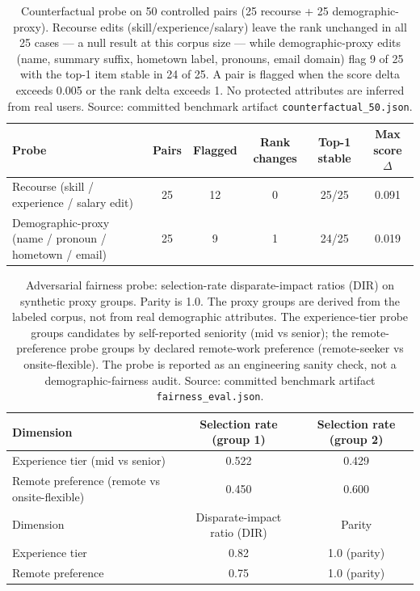 \begin{table}[!t]
\centering
\caption{Counterfactual probe on 50 controlled pairs (25 recourse + 25 demographic-proxy). Recourse edits (skill/experience/salary) leave the rank unchanged in all 25 cases --- a null result at this corpus size --- while demographic-proxy edits (name, summary suffix, hometown label, pronouns, email domain) flag 9 of 25 with the top-1 item stable in 24 of 25. A pair is flagged when the score delta exceeds 0.005 or the rank delta exceeds 1. No protected attributes are inferred from real users. Source: committed benchmark artifact \texttt{counterfactual\_50.json}.}
\label{tab:counterfactual}
\scriptsize
\setlength{\tabcolsep}{4pt}
\begin{tabular*}{\textwidth}{@{\extracolsep{\fill}}lccccc@{}}
\toprule
Probe & Pairs & Flagged & Rank changes & Top-1 stable & Max score $\Delta$ \\
\midrule
Recourse (skill / experience / salary edit)           & 25 & 12 & 0 & 25/25 & 0.091 \\
Demographic-proxy (name / pronoun / hometown / email) & 25 & 9  & 1 & 24/25 & 0.019 \\
\bottomrule
\end{tabular*}
\end{table}

\begin{table}[!t]
\centering
\caption{Adversarial fairness probe: selection-rate disparate-impact ratios (DIR) on synthetic proxy groups. Parity is 1.0. The proxy groups are derived from the labeled corpus, not from real demographic attributes. The experience-tier probe groups candidates by self-reported seniority (mid vs senior); the remote-preference probe groups by declared remote-work preference (remote-seeker vs onsite-flexible). The probe is reported as an engineering sanity check, not a demographic-fairness audit. Source: committed benchmark artifact \texttt{fairness\_eval.json}.}
\label{tab:fairness}
\begin{tabular}{@{}lcc@{}}
\toprule
Dimension & Selection rate (group 1) & Selection rate (group 2) \\
\midrule
Experience tier (mid vs senior)  & 0.522 & 0.429 \\
Remote preference (remote vs onsite-flexible) & 0.450 & 0.600 \\
\midrule
Dimension & Disparate-impact ratio (DIR) & Parity \\
\midrule
Experience tier  & 0.82 & 1.0 (parity) \\
Remote preference & 0.75 & 1.0 (parity) \\
\bottomrule
\end{tabular}
\end{table}

